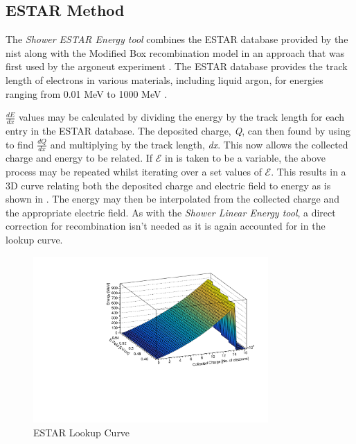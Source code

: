 \subsection{ESTAR Method}
The \textit{Shower ESTAR Energy tool} combines the ESTAR database provided by the \gls{nist} along with the Modified Box recombination model in an approach that was first used by the \Gls{argoneut} experiment \cite{ArgoNeuT_ESTAR_paper}. The ESTAR database provides the track length of electrons in various materials, including liquid argon, for energies ranging from 0.01 MeV to 1000 MeV \cite{ESTAR_Database}.

$\frac{dE}{dx}$ values may be calculated by dividing the energy by the track length for each entry in the ESTAR database. The deposited charge, \textit{Q}, can then found by using  to find $\frac{dQ}{dx}$ and multiplying by the track length, \textit{dx}. This now allows the collected charge and energy to be related. If $\mathcal{E}$ in  is taken to be a variable, the above process may be repeated whilst iterating over a set values of $\mathcal{E}$. This results in a 3D curve relating both the deposited charge and electric field to energy as is shown in . The energy may then be interpolated from the collected charge and the appropriate electric field. As with the \textit{Shower Linear Energy tool}, a direct correction for recombination isn't needed as it is again accounted for in the lookup curve. 

\begin{figure}[h]
    \centering
    \includegraphics[width = 0.8\textwidth]{figures-chap4/ESTAR_lookup_curve.pdf}
    \caption{ESTAR Lookup Curve}
    \label{fig:ESTAR lookup curve}
\end{figure}

